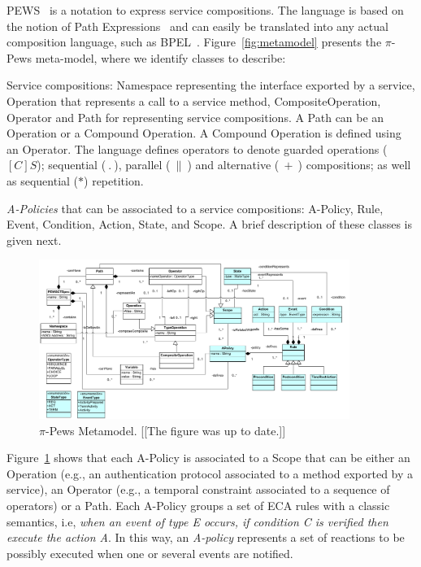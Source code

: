 PEWS~\cite{BHM06,Placido2010LTPD} is a notation to express service compositions.
The language is based on the notion of Path Expressions~\cite{And79} and can easily be translated into any actual composition language, such as BPEL~\cite{bpel03}. 
Figure~\ref{fig:metamodel} presents the $\pi$-{\sc Pews} meta-model, where we identify classes to describe:
\begin{itemizedTrivlist}
\item Service compositions: {\sc Namespace} representing the interface exported by a service, {\sc Operation} that represents a call to a service method, {\sc CompositeOperation}, {\sc Operator} and {\sc Path} for representing service compositions.
A {\sc Path} can be an {\sc Operation} or a {\sc Compound Operation}. 
A {\sc Compound Operation} is defined using an {\sc Operator}.
The language defines operators to denote guarded operations ($[C]S$); sequential ($\ . \ $), parallel ($\ \| \ $) and alternative ($\ + \ $) compositions; as well as sequential ($*$) repetition.

\item {\em A-Policies} that can be associated to a service compositions:  {\sc A-Policy}, {\sc Rule}, {\sc Event}, {\sc Condition}, {\sc Action}, {\sc State}, and {\sc Scope}.
A brief description of these classes is given next.
\end{itemizedTrivlist}
%
\begin{figure}[t]
\centering
\includegraphics[width=0.9\textwidth]{figs/PEWSMetamodel_old}
\caption{$\pi$-{\sc Pews} Metamodel.  {\color{blue}[[The figure was up
to date.]]}}
\label{fig:PPEWSmetamodel}
\end{figure}

Figure~\ref{fig:PPEWSmetamodel} shows that each {\sc A-Policy} is associated to a {\sc Scope} that can be either an {\sc Operation} (e.g., an authentication protocol associated to a method exported by a service),  an {\sc Operator} (e.g., a temporal constraint associated to a sequence of operators) or a {\sc Path}.  
Each {\sc A-Policy} groups a set of ECA rules with a classic semantics, i.e, {\em when an event of type E occurs, if condition C is verified then execute the action A}.  
In this way, an {\em A-policy} represents a set of reactions to be possibly executed when one or several events are notified.
 

